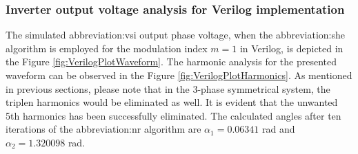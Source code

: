 \documentclass[a4paper, twoside, 11pt]{article}
\begin{document}
        
    \FloatBarrier

    \subsubsection{Inverter output voltage analysis for Verilog implementation}
        The simulated \gls{abbreviation:vsi} output phase voltage, when the \gls{abbreviation:she} algorithm is employed for the modulation index $m = 1$ in Verilog, is depicted in the Figure \ref{fig:VerilogPlotWaveform}. The harmonic analysis for the presented waveform can be observed in the Figure \ref{fig:VerilogPlotHarmonics}. As mentioned in previous sections, please note that in the 3-phase symmetrical system, the triplen harmonics would be eliminated as well. It is evident that the unwanted 5th harmonics has been successfully eliminated. The calculated angles after ten iterations of the \gls{abbreviation:nr} algorithm are $\alpha_1 = 0.06341$ rad and $\alpha_2 = 1.320098$ rad.
\end{document}
